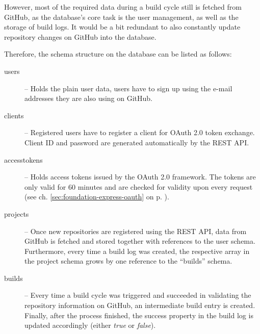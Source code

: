 However, most of the required data during a build cycle still is fetched from GitHub, as the database's core task is the user management, as well as the storage of build logs. It would be a bit redundant to also constantly update repository changes on GitHub into the database.

Therefore, the schema structure on the database can be listed as follows:

\begin{description}
  \item[users] -- Holds the plain user data, users have to sign up using the e-mail addresses they are also using on GitHub.
  \item[clients] -- Registered users have to register a client for OAuth 2.0 token exchange. Client ID and password are generated automatically by the REST API.
  \item[accesstokens] -- Holds access tokens issued by the OAuth 2.0 framework. The tokens are only valid for 60 minutes and are checked for validity upon every request (see ch. \ref{sec:foundation-express-oauth} on p. \pageref{sec:foundation-express-oauth}).
  \item[projects] -- Once new repositories are registered using the REST API, data from GitHub is fetched and stored together with references to the user schema. Furthermore, every time a build log was created, the respective array in the project schema grows by one reference to the ``builds'' schema.
  \item[builds] -- Every time a build cycle was triggered and succeeded in validating the repository information on GitHub, an intermediate build entry is created. Finally, after the process finished, the success property in the build log is updated accordingly (either \emph{true} or \emph{false}).
\end{description}
